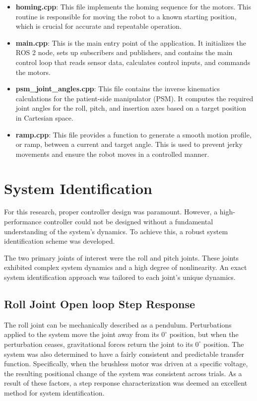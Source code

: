 \begin{itemize}
    \item \textbf{homing.cpp}: This file implements the homing sequence for the motors. This routine is responsible for moving the robot to a known starting position, which is crucial for accurate and repeatable operation.
    \item \textbf{main.cpp}: This is the main entry point of the application. It initializes the ROS 2 node, sets up subscribers and publishers, and contains the main control loop that reads sensor data, calculates control inputs, and commands the motors.
    \item \textbf{psm\_joint\_angles.cpp}: This file contains the inverse kinematics calculations for the patient-side manipulator (PSM). It computes the required joint angles for the roll, pitch, and insertion axes based on a target position in Cartesian space.
    \item \textbf{ramp.cpp}: This file provides a function to generate a smooth motion profile, or ramp, between a current and target angle. This is used to prevent jerky movements and ensure the robot moves in a controlled manner.
\end{itemize}

\section{System Identification}

For this research, proper controller design was paramount. However, a high-performance controller could not be designed without a fundamental understanding of the system's dynamics. To achieve this, a robust system identification scheme was developed.

The two primary joints of interest were the roll and pitch joints. These joints exhibited complex system dynamics and a high degree of nonlinearity. An exact system identification approach was tailored to each joint's unique dynamics.

\subsection{Roll Joint Open loop Step Response}

The roll joint can be mechanically described as a pendulum. Perturbations applied to the system move the joint away from its $0^\circ$ position, but when the perturbation ceases, gravitational forces return the joint to its $0^\circ$ position. The system was also determined to have a fairly consistent and predictable transfer function. Specifically, when the brushless motor was driven at a specific voltage, the resulting positional change of the system was consistent across trials. As a result of these factors, a step response characterization was deemed an excellent method for system identification.

